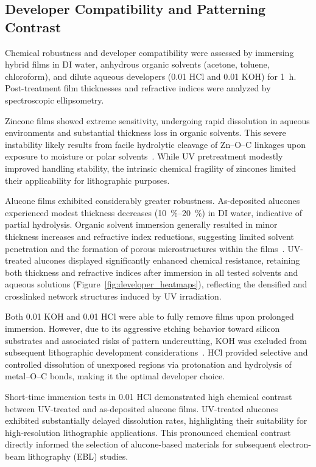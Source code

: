 \subsection{Developer Compatibility and Patterning Contrast}

Chemical robustness and developer compatibility were assessed by immersing hybrid films in DI water, anhydrous organic solvents (acetone, toluene, chloroform), and dilute aqueous developers (\SI{0.01}{\molar} HCl and \SI{0.01}{\molar} KOH) for \SI{1}{\hour}. Post-treatment film thicknesses and refractive indices were analyzed by spectroscopic ellipsometry.

Zincone films showed extreme sensitivity, undergoing rapid dissolution in aqueous environments and substantial thickness loss in organic solvents. This severe instability likely results from facile hydrolytic cleavage of Zn--O--C linkages upon exposure to moisture or polar solvents~\cite{REF}. While UV pretreatment modestly improved handling stability, the intrinsic chemical fragility of zincones limited their applicability for lithographic purposes.

Alucone films exhibited considerably greater robustness. As-deposited alucones experienced modest thickness decreases (\SIrange{10}{20}{\percent}) in DI water, indicative of partial hydrolysis. Organic solvent immersion generally resulted in minor thickness increases and refractive index reductions, suggesting limited solvent penetration and the formation of porous microstructures within the films~\cite{REF}. UV-treated alucones displayed significantly enhanced chemical resistance, retaining both thickness and refractive indices after immersion in all tested solvents and aqueous solutions (Figure~\ref{fig:developer_heatmaps}), reflecting the densified and crosslinked network structures induced by UV irradiation.

Both \SI{0.01}{\molar} KOH and \SI{0.01}{\molar} HCl were able to fully remove films upon prolonged immersion. However, due to its aggressive etching behavior toward silicon substrates and associated risks of pattern undercutting, KOH was excluded from subsequent lithographic development considerations~\cite{REF}. HCl provided selective and controlled dissolution of unexposed regions via protonation and hydrolysis of metal--O--C bonds, making it the optimal developer choice.

Short-time immersion tests in \SI{0.01}{\molar} HCl demonstrated high chemical contrast between UV-treated and as-deposited alucone films. UV-treated alucones exhibited substantially delayed dissolution rates, highlighting their suitability for high-resolution lithographic applications. This pronounced chemical contrast directly informed the selection of alucone-based materials for subsequent electron-beam lithography (EBL) studies.

